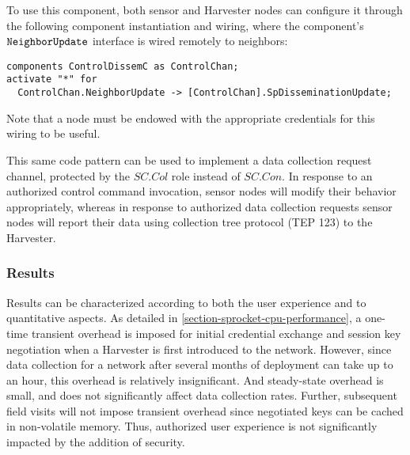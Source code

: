 To use this component, both sensor and Harvester nodes can configure it through the following
component instantiation and wiring, where the component's $\verb+NeighborUpdate+$ interface is
wired remotely to neighbors:
\begin{Verbatim}
components ControlDissemC as ControlChan;
activate "*" for 
  ControlChan.NeighborUpdate -> [ControlChan].SpDisseminationUpdate;
\end{Verbatim}
Note that a node must be endowed with the appropriate credentials for this wiring to be useful.

This same code pattern can be used to implement a data collection request channel, protected by
the $\mathit{SC.Col}$ role instead of $\mathit{SC.Con}$. In response to an authorized control
command invocation, sensor nodes will modify their behavior appropriately, whereas in response
to authorized data collection requests sensor nodes will report their data using collection tree
protocol (TEP 123) to the Harvester.

\subsubsection{Results}

Results can be characterized according to both the user experience and to quantitative aspects.
As detailed in \autoref{section-sprocket-cpu-performance}, a one-time transient overhead is
imposed for initial credential exchange and session key negotiation when a Harvester is first
introduced to the network. However, since data collection for a network after several months of
deployment can take up to an hour, this overhead is relatively insignificant. And steady-state
overhead is small, and does not significantly affect data collection rates. Further, subsequent
field visits will not impose transient overhead since negotiated keys can be cached in
non-volatile memory. Thus, authorized user experience is not significantly impacted by the
addition of security.

